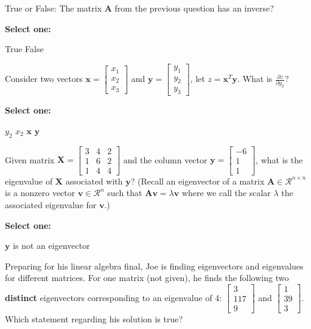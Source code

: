 \documentclass[11pt,addpoints,answers]{exam}
\numberwithin{equation}{section} %
\numberwithin{figure}{section} %
\numberwithin{table}{section} %
\newcommand{\vv}{\mathbf{v}}
\newcommand{\xv}{\mathbf{x}}
\newcommand{\yv}{\mathbf{y}}
\begin{document}
\begin{questions}
    \question[1] True or False: The matrix $\mathbf{A}$ from the previous question has an inverse?

    \textbf{Select one:}
    \begin{checkboxes}
        \choice True
        \choice False
    \end{checkboxes}

    
    \question[2] Consider two vectors $\xv = \begin{bmatrix} x_1 \\ x_2 \\ x_3 \end{bmatrix}$ and $\yv = \begin{bmatrix} y_1 \\ y_2 \\ y_3 \end{bmatrix}$, let $z = \xv^T \yv$. What is $\frac{\partial z}{\partial y_2}$? 
    
    \textbf{Select one:}
    \begin{checkboxes}
        \choice $y_2$
        \choice $x_2$
        \choice $\xv$
        \choice $\yv$
    \end{checkboxes}
    
    
    
    \clearpage
    
    \question[2] Given matrix $\mathbf{X}=\begin{bmatrix} 3 & 4 & 2 \\ 1 & 6 & 2 \\ 1 & 4 & 4 \end{bmatrix} $ and the column vector $\mathbf{y}=\begin{bmatrix} -6 \\ 1 \\ 1 \end{bmatrix}$, what is the eigenvalue of $\mathbf{X}$ associated with $\mathbf{y}$? (Recall an eigenvector of a matrix $\mathbf{A} \in \mathcal{R}^{n \times n}$ is a nonzero vector $\vv \in \mathcal{R}^n$ such that $\mathbf{A}\vv = \lambda\vv$ where we call the scalar $\lambda$ the associated eigenvalue for $\vv$.)

    \textbf{Select one:}
    \begin{checkboxes}
        \choice $\mathbf{y}$ is not an eigenvector
    \end{checkboxes}

    
    \question[2] Preparing for his linear algebra final, Joe is finding eigenvectors and eigenvalues for different matrices. For one matrix (not given), he finds the following two \textbf{distinct} eigenvectors corresponding to an eigenvalue of 4: $\begin{bmatrix} 3 \\ 117 \\ 9 \end{bmatrix}$ and $\begin{bmatrix} 1 \\ 39 \\ 3 \end{bmatrix}$. Which statement regarding his solution is true?
    

\end{questions}
\end{document}
